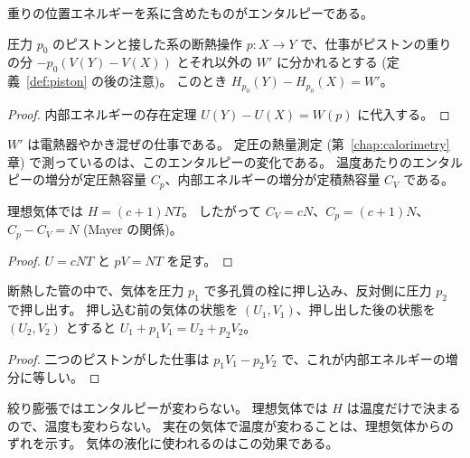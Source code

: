 重りの位置エネルギーを系に含めたものがエンタルピーである。

\begin{theorem}[定圧での仕事とエンタルピー]
  \label{thm:enthalpy-change}
  \leanok
  圧力 $p_0$ のピストンと接した系の断熱操作 $p : X \to Y$ で、仕事がピストンの重りの分 $-p_0 (V(Y) - V(X))$ とそれ以外の $W'$ に分かれるとする (定義~\ref{def:piston} の後の注意)。
  このとき $H_{p_0}(Y) - H_{p_0}(X) = W'$。
\end{theorem}

\begin{proof}
  \leanok
  内部エネルギーの存在定理 $U(Y) - U(X) = W(p)$ に代入する。
\end{proof}

$W'$ は電熱器やかき混ぜの仕事である。
定圧の熱量測定 (第~\ref{chap:calorimetry} 章) で測っているのは、このエンタルピーの変化である。
温度あたりのエンタルピーの増分が定圧熱容量 $C_p$、内部エネルギーの増分が定積熱容量 $C_V$ である。

\begin{theorem}[理想気体のエンタルピー]
  \label{thm:ideal-gas-enthalpy}
  \leanok
  理想気体では $H = (c + 1) N T$。
  したがって $C_V = cN$、$C_p = (c + 1) N$、$C_p - C_V = N$ (Mayer の関係)。
\end{theorem}

\begin{proof}
  \leanok
  $U = cNT$ と $pV = NT$ を足す。
\end{proof}

\begin{theorem}
  \label{thm:joule-thomson}
  \leanok
  断熱した管の中で、気体を圧力 $p_1$ で多孔質の栓に押し込み、反対側に圧力 $p_2$ で押し出す。
  押し込む前の気体の状態を $(U_1, V_1)$、押し出した後の状態を $(U_2, V_2)$ とすると $U_1 + p_1 V_1 = U_2 + p_2 V_2$。
\end{theorem}

\begin{proof}
  \leanok
  二つのピストンがした仕事は $p_1 V_1 - p_2 V_2$ で、これが内部エネルギーの増分に等しい。
\end{proof}

絞り膨張ではエンタルピーが変わらない。
理想気体では $H$ は温度だけで決まるので、温度も変わらない。
実在の気体で温度が変わることは、理想気体からのずれを示す。
気体の液化に使われるのはこの効果である。

